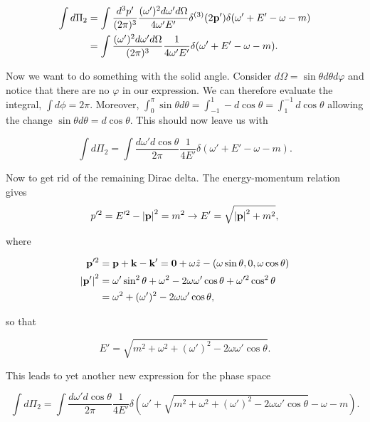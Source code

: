 \documentclass[11pt, a4paper]{amsart}
\begin{document}
\begin{align}
\int d\Pi_2 &= \int \frac{d^3p'}{(2\pi)^3} \frac{(\omega')^2d\omega' d\Omega}{4\omega' E'} \delta^{(3)} (2\vb{p}') \delta (\omega' + E' - \omega -m) \\
		&= \int \frac{(\omega')^2 d\omega' d\Omega}{(2\pi)^3} \frac{1}{4\omega' E'} \delta (\omega' + E' - \omega - m) .
\end{align}

Now we want to do something with the solid angle. Consider $ d\Omega = \sin\theta d\theta d\varphi$ and notice that there are no $\varphi$ in our expression. We can therefore evaluate the integral, $\int d\phi = 2\pi$. Moreover, $\int_0^\pi \sin\theta d\theta = \int_{-1}^1 -d\cos\theta = \int_1^{-1} d\cos\theta$ allowing the change $\sin\theta d\theta = d\cos\theta$. This should now leave us with

\begin{equation}
\int d\Pi_2 = \int \frac{d\omega' d\cos\theta}{2\pi} \frac{1}{4E'} \delta (\omega' + E' - \omega -m).
\end{equation}

Now to get rid of the remaining Dirac delta. The energy-momentum relation gives
\begin{equation}
p'^2 = E'^2 - \abs{\vb{p}}^2 = m^2 \rightarrow E' = \sqrt{\abs{\vb{p}}^2 + m^2},
\end{equation}

where 

\begin{align}
\vb{p}'^2 &= \vb{p} + \vb{k} - \vb{k}' = \vb{0} + \omega\hat{z} - (\omega\sin\theta, 0, \omega\cos\theta) \\
\abs{\vb{p}'}^2	&= \omega'\sin^2\theta + \omega^2 - 2\omega\omega'\cos\theta + \omega'^2\cos^2\theta \\
						&= \omega^2 + (\omega')^2 - 2\omega\omega'\cos\theta,
\end{align}

so that

\begin{equation}
E' = \sqrt{m^2 + \omega^2 + (\omega')^2 - 2\omega\omega'\cos\theta}.
\end{equation}

This leads to yet another new expression for the phase space

\begin{equation}
\int d\Pi_2 = \int \frac{d\omega' d\cos\theta}{2\pi} \frac{1}{4E'} \delta (\omega' + \sqrt{m^2 + \omega^2 + (\omega')^2 - 2\omega\omega'\cos\theta} - \omega -m).
\end{equation}
\end{document}
